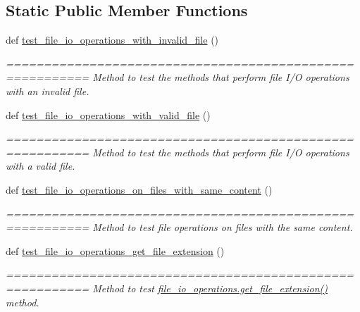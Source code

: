 \subsection*{Static Public Member Functions}
\begin{DoxyCompactItemize}
\item 
def \hyperlink{classutilities_1_1file__io__tester_1_1file__io__operations__tester_a847cc701af96fbf9558cdae859f379d6}{test\+\_\+file\+\_\+io\+\_\+operations\+\_\+with\+\_\+invalid\+\_\+file} ()
\begin{DoxyCompactList}\small\item\em ========================================================= Method to test the methods that perform file I/\+O operations with an invalid file. \end{DoxyCompactList}\item 
def \hyperlink{classutilities_1_1file__io__tester_1_1file__io__operations__tester_a9683b5a406697686900d28455bd3d5c3}{test\+\_\+file\+\_\+io\+\_\+operations\+\_\+with\+\_\+valid\+\_\+file} ()
\begin{DoxyCompactList}\small\item\em ========================================================= Method to test the methods that perform file I/\+O operations with a valid file. \end{DoxyCompactList}\item 
def \hyperlink{classutilities_1_1file__io__tester_1_1file__io__operations__tester_a5efc5f988841df586d1db5619d5fe49e}{test\+\_\+file\+\_\+io\+\_\+operations\+\_\+on\+\_\+files\+\_\+with\+\_\+same\+\_\+content} ()
\begin{DoxyCompactList}\small\item\em ========================================================= Method to test file operations on files with the same content. \end{DoxyCompactList}\item 
def \hyperlink{classutilities_1_1file__io__tester_1_1file__io__operations__tester_a264a387fe5693619617b8b10be1354af}{test\+\_\+file\+\_\+io\+\_\+operations\+\_\+get\+\_\+file\+\_\+extension} ()
\begin{DoxyCompactList}\small\item\em ========================================================= Method to test \hyperlink{classutilities_1_1file__io_1_1file__io__operations_a7e3cbb46884ca64a14cd367b1e625082}{file\+\_\+io\+\_\+operations.\+get\+\_\+file\+\_\+extension()} method. \end{DoxyCompactList}\item 

\end{DoxyCompactItemize}
